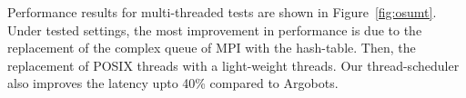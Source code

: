 Performance results for multi-threaded tests are shown in
Figure~\ref{fig:osumt}.  Under tested settings, the most improvement in
performance is due to the replacement of the complex queue of MPI with the
hash-table.  Then, the replacement of POSIX threads with a light-weight
threads. Our thread-scheduler also improves the latency upto 40\% compared
to Argobots.
